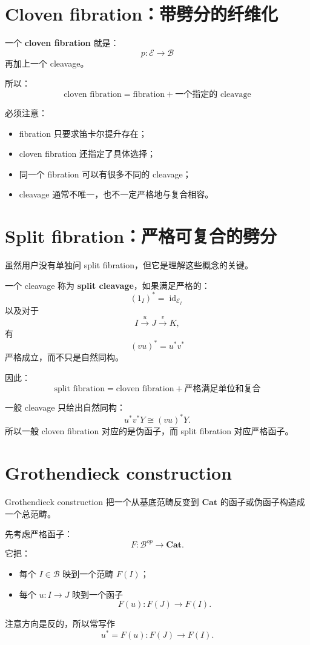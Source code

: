 \documentclass[12pt,a4paper]{article}
\begin{document}
\section{Cloven fibration：带劈分的纤维化}

一个 \textbf{cloven fibration} 就是：
\[
p:\mathcal{E}\to\mathcal{B}
\]
再加上一个 cleavage。

所以：
\[
\boxed{
\text{cloven fibration}
=
\text{fibration}
+
\text{一个指定的 cleavage}
}
\]

必须注意：
\begin{itemize}
  \item fibration 只要求笛卡尔提升存在；
  \item cloven fibration 还指定了具体选择；
  \item 同一个 fibration 可以有很多不同的 cleavage；
  \item cleavage 通常不唯一，也不一定严格地与复合相容。
\end{itemize}

\section{Split fibration：严格可复合的劈分}

虽然用户没有单独问 split fibration，但它是理解这些概念的关键。

一个 cleavage 称为 \textbf{split cleavage}，如果满足严格的：
\[
(1_I)^*=\operatorname{id}_{\mathcal{E}_I}
\]
以及对于
\[
I\xrightarrow{u}J\xrightarrow{v}K,
\]
有
\[
(vu)^*=u^*v^*
\]
严格成立，而不只是自然同构。

因此：
\[
\boxed{
\text{split fibration}
=
\text{cloven fibration}
+
\text{严格满足单位和复合}
}
\]

一般 cleavage 只给出自然同构：
\[
u^*v^*Y\cong (vu)^*Y.
\]
所以一般 cloven fibration 对应的是伪函子，而 split fibration 对应严格函子。

\section{Grothendieck construction}

Grothendieck construction 把一个从基底范畴反变到 \(\mathbf{Cat}\) 的函子或伪函子构造成一个总范畴。

先考虑严格函子：
\[
F:\mathcal{B}^{op}\to\mathbf{Cat}.
\]
它把：
\begin{itemize}
  \item 每个 \(I\in\mathcal{B}\) 映到一个范畴 \(F(I)\)；
  \item 每个 \(u:I\to J\) 映到一个函子
  \[
  F(u):F(J)\to F(I).
  \]
\end{itemize}
注意方向是反的，所以常写作
\[
u^*=F(u):F(J)\to F(I).
\]
\end{document}
